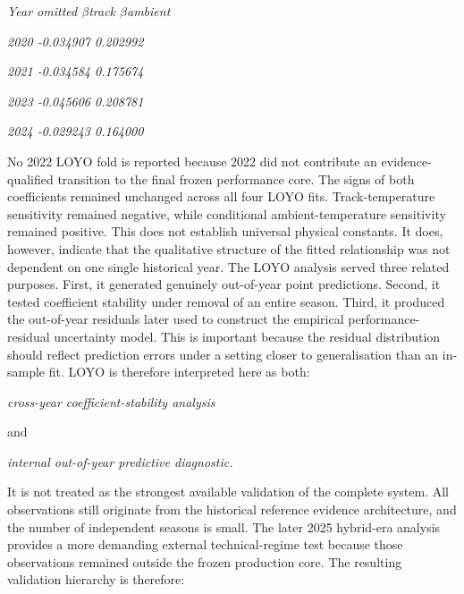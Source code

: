 \begin{center}\textit{Year omitted       \ensuremath{\beta}track     \ensuremath{\beta}ambient}\end{center}

\begin{center}\textit{2020         -0.034907    0.202992}\end{center}

\begin{center}\textit{2021         -0.034584    0.175674}\end{center}

\begin{center}\textit{2023         -0.045606    0.208781}\end{center}

\begin{center}\textit{2024         -0.029243    0.164000}\end{center}

No 2022 LOYO fold is reported because 2022 did not contribute an evidence-qualified transition to the final frozen performance core. The signs of both coefficients remained unchanged across all four LOYO fits. Track-temperature sensitivity remained negative, while conditional ambient-temperature sensitivity remained positive. This does not establish universal physical constants. It does, however, indicate that the qualitative structure of the fitted relationship was not dependent on one single historical year. The LOYO analysis served three related purposes. First, it generated genuinely out-of-year point predictions. Second, it tested coefficient stability under removal of an entire season. Third, it produced the out-of-year residuals later used to construct the empirical performance-residual uncertainty model. This is important because the residual distribution should reflect prediction errors under a setting closer to generalisation than an in-sample fit. LOYO is therefore interpreted here as both:

\begin{center}\textit{cross-year coefficient-stability analysis}\end{center}

and

\begin{center}\textit{internal out-of-year predictive diagnostic.}\end{center}

It is not treated as the strongest available validation of the complete system. All observations still originate from the historical reference evidence architecture, and the number of independent seasons is small. The later 2025 hybrid-era analysis provides a more demanding external technical-regime test because those observations remained outside the frozen production core. The resulting validation hierarchy is therefore:

